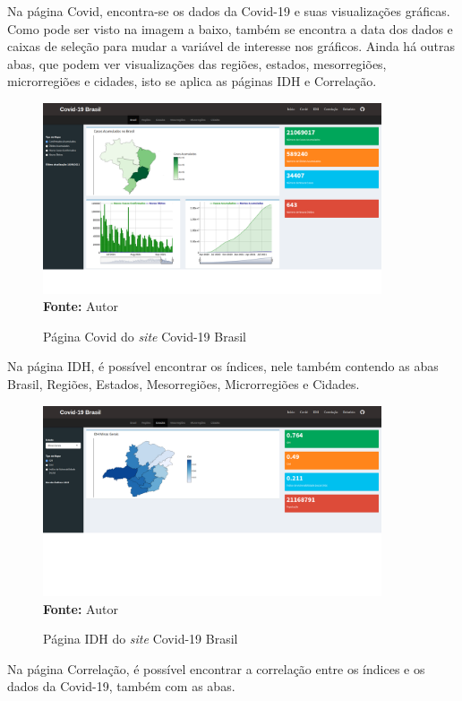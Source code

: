 \documentclass[
  fleqn,ebook]{ic}
\begin{document}
Na página Covid, encontra-se os dados da Covid-19 e suas visualizações gráficas.
Como pode ser visto na imagem a baixo, também se encontra a data dos dados e
caixas de seleção para mudar a variável de interesse nos gráficos. Ainda há
outras abas, que podem ver visualizações das regiões, estados, mesorregiões,
microrregiões e cidades, isto se aplica as páginas IDH e Correlação.

\begin{figure}[H]
    \centering
    \caption{Página Covid do \textit{site} Covid-19 Brasil}
    \includegraphics[width=10cm]{img/covidbrasil.png} \\
    {\footnotesize \textbf{Fonte: }Autor}
    \label{fig:covidbrasil}
\end{figure}

Na página IDH, é possível encontrar os índices, nele também contendo as abas
Brasil, Regiões, Estados, Mesorregiões, Microrregiões e Cidades.

\begin{figure}[H]
    \centering
    \caption{Página IDH do \textit{site} Covid-19 Brasil}
    \includegraphics[width=10cm]{img/estadoidh.png} \\
    {\footnotesize \textbf{Fonte: }Autor}
    \label{fig:estadoidh}
\end{figure}

Na página Correlação, é possível encontrar a correlação entre os índices e os
dados da Covid-19, também com as abas.
\end{document}
